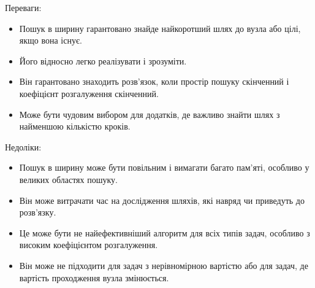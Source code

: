 Переваги:
\begin{itemize}
    \item Пошук в ширину гарантовано знайде найкоротший шлях до вузла або цілі, якщо вона існує.
    \item Його відносно легко реалізувати і зрозуміти.
    \item Він гарантовано знаходить розв'язок, коли простір пошуку скінченний і коефіцієнт розгалуження скінченний.
    \item Може бути чудовим вибором для додатків, де важливо знайти шлях з найменшою кількістю кроків.
\end{itemize}

Недоліки:
\begin{itemize}
    \item Пошук в ширину може бути повільним і вимагати багато пам'яті, особливо у великих областях пошуку.
    \item Він може витрачати час на дослідження шляхів, які навряд чи приведуть до розв'язку.
    \item Це може бути не найефективніший алгоритм для всіх типів задач, особливо з високим коефіцієнтом розгалуження.
    \item Він може не підходити для задач з нерівномірною вартістю або для задач, де вартість проходження вузла змінюється.
\end{itemize}
